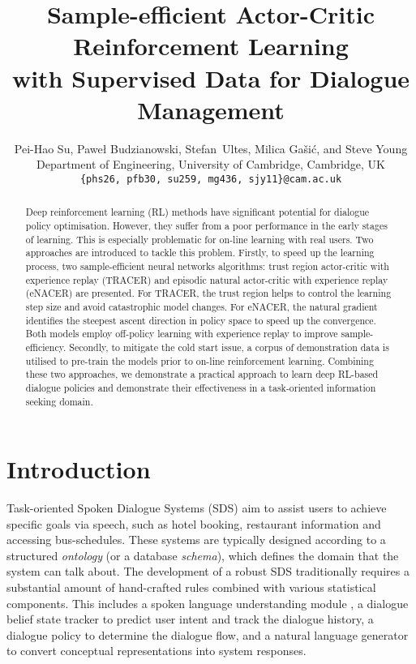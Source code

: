 \documentclass[11pt,a4paper]{article}
\title{Sample-efficient Actor-Critic Reinforcement Learning \\with Supervised Data for Dialogue Management}
\author{
Pei-Hao Su, Pawe\l{} Budzianowski,  Stefan~Ultes, Milica Ga{\v s}i{\' c}, and Steve Young \\
Department of Engineering,
University of Cambridge,
Cambridge, UK\\
\texttt{\{phs26, pfb30, su259, mg436, sjy11\}@cam.ac.uk} \\
}
\date{}
\begin{document}
\maketitle

\begin{abstract}
Deep reinforcement learning (RL) methods have significant potential for dialogue policy optimisation. 
However, they 
suffer from a poor performance in the early stages of learning. This is especially problematic for on-line learning with real users.
Two approaches are introduced to tackle this problem. Firstly, to speed up the learning process, two sample-efficient neural networks algorithms: trust region actor-critic with experience replay (TRACER)  and episodic natural actor-critic with experience replay (eNACER) are presented. 
For TRACER, the trust region helps to control the learning step size and avoid catastrophic model changes. 
For eNACER, the natural gradient identifies the steepest ascent direction in policy space to speed up the convergence.
Both models employ  off-policy learning with experience replay to improve sample-efficiency. 
Secondly, to mitigate the cold start issue, a corpus of demonstration data is utilised to pre-train the models prior to 
on-line reinforcement learning. 
Combining these two approaches, we demonstrate a practical approach to learn deep RL-based dialogue policies and
demonstrate their effectiveness in a task-oriented information seeking domain.

\end{abstract}

\section{Introduction} \label{sec:intro}
Task-oriented Spoken Dialogue Systems (SDS) aim to assist users to achieve specific goals via speech, such as hotel booking, restaurant information and  accessing bus-schedules.
These systems are typically designed according to a structured {\it ontology} (or a database {\it schema}), which defines the domain that the system can talk about.
The development of a robust SDS traditionally requires a substantial amount of hand-crafted rules combined with various statistical components. This includes a spoken language understanding module \cite{chen2016end,yang2017end}, a dialogue belief state tracker \cite{Henderson2014b,perez2016dialog,Mrksic:17} to predict user intent and track the dialogue history, a dialogue policy \cite{POMDP-review,GPRL,pfb_hrl} to determine the dialogue flow, and a natural language generator \cite{rieser2009natural,wensclstm15,hu2017controllable} to convert conceptual representations into system responses.
\end{document}
